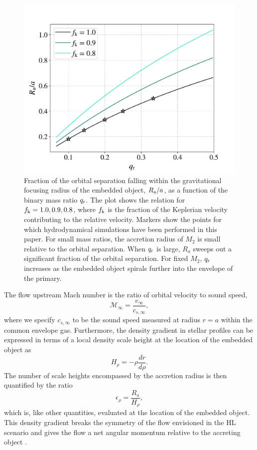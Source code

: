 \begin{figure}[t]
  \includegraphics[width=\columnwidth]{figures/common_envelope/ra-q_3fks.pdf}
 \caption{Fraction of the orbital separation falling within the gravitational focusing radius of the embedded object, $R_{\rm a}/a$, as a function of the binary mass ratio $q_{\rm r}$. The plot shows the relation for $f_{\rm k} = 1.0, 0.9, 0.8$, where $f_{\rm k}$ is the fraction of the Keplerian velocity contributing to the relative velocity. Markers show the points for which hydrodynamical simulations have been performed in this paper. For small mass ratios, the accretion radius of $M_2$ is small relative to the orbital separation.  When $q_{\rm r}$ is large, $R_a$ sweeps out a significant fraction of the orbital separation.  For fixed $M_2$, $q_{\rm r}$  increases as the  embedded object spirals further into the envelope of the primary.
 \label{fig:ra-q}}
\vspace{5mm}
\end{figure}

The flow upstream Mach number is the ratio of orbital velocity to sound speed, 
\begin{equation}
\mathcal{M}_\infty = \frac{v_\infty}{c_{s, \infty}},
\end{equation}
where we specify $c_{s, \infty}$ to be the sound speed measured at radius $r=a$ within the common envelope gas. 
Furthermore, the density gradient in stellar profiles can be expressed in terms of a local density scale height at the location of the embedded object as
\begin{equation}
H_\rho = -\rho \frac{dr}{d\rho} . 
\end{equation}
The number of scale heights encompassed by the accretion radius is then quantified by the ratio
\begin{equation}
\epsilon_\rho = \frac{R_{\mathrm{a}} }{ H_\rho} ,    
\end{equation}
which is, like other quantities, evaluated at the location of the embedded object. This density gradient breaks the symmetry of the flow envisioned in the HL scenario and gives the flow a net angular momentum relative to the accreting object \cite{MacLeod_2015,MacLeod:2014yda,MacLeod:2017,Murguia-Berthier:2017}.

